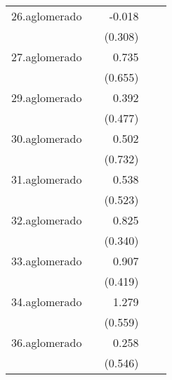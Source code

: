 {\begin{longtable}{l*{4}{D{.}{.}{-1}}}
\addlinespace
26.aglomerado&                     &      -0.018         &                     &                     \\
            &                     &     (0.308)         &                     &                     \\
\addlinespace
27.aglomerado&                     &       0.735         &                     &                     \\
            &                     &     (0.655)         &                     &                     \\
\addlinespace
29.aglomerado&                     &       0.392         &                     &                     \\
            &                     &     (0.477)         &                     &                     \\
\addlinespace
30.aglomerado&                     &       0.502         &                     &                     \\
            &                     &     (0.732)         &                     &                     \\
\addlinespace
31.aglomerado&                     &       0.538         &                     &                     \\
            &                     &     (0.523)         &                     &                     \\
\addlinespace
32.aglomerado&                     &       0.825\sym{*}  &                     &                     \\
            &                     &     (0.340)         &                     &                     \\
\addlinespace
33.aglomerado&                     &       0.907\sym{*}  &                     &                     \\
            &                     &     (0.419)         &                     &                     \\
\addlinespace
34.aglomerado&                     &       1.279\sym{*}  &                     &                     \\
            &                     &     (0.559)         &                     &                     \\
\addlinespace
36.aglomerado&                     &       0.258         &                     &                     \\
            &                     &     (0.546)         &                     &                     \\

\end{longtable}}
